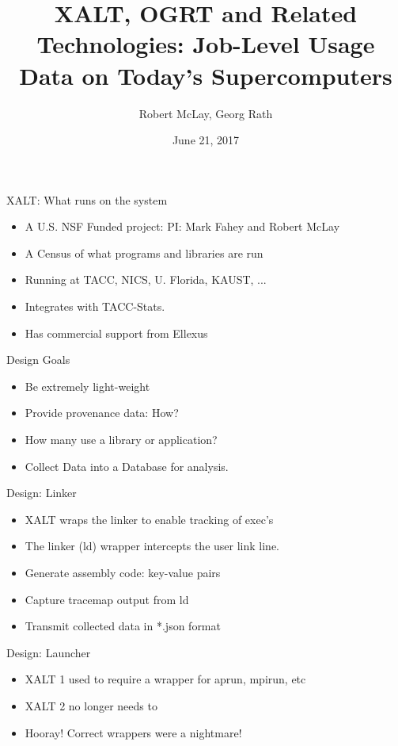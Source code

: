\documentclass{beamer}
\title{ XALT, OGRT and Related Technologies: Job-Level Usage Data on Today's Supercomputers}
\author{Robert McLay, Georg Rath}
\institute{The Texas Advanced Computing Center, RATH.IO}
\date{June 21, 2017}  %
\begin{document}
\begin{frame}
  \titlepage
\end{frame}

\begin{frame}{XALT: What runs on the system}
  \begin{itemize}
    \item A U.S. NSF Funded project: PI: Mark Fahey and Robert McLay
    \item A Census of what programs and libraries are run
    \item Running at TACC, NICS, U. Florida, KAUST, ...
    \item Integrates with TACC-Stats.
    \item Has commercial support from Ellexus 
  \end{itemize}
\end{frame}

\begin{frame}{Design Goals}
  \begin{itemize}
    \item Be extremely light-weight
    \item Provide provenance data: How?
    \item How many use a library or application?
    \item Collect Data into a Database for analysis.
  \end{itemize}
\end{frame}

\begin{frame}{Design: Linker}
  \begin{itemize}
    \item XALT wraps the linker to enable tracking of exec's
    \item The linker (ld) wrapper intercepts the user link line.
    \item Generate assembly code: key-value pairs
    \item Capture tracemap output from ld
    \item Transmit collected data in *.json format
  \end{itemize}
\end{frame}

\begin{frame}{Design: Launcher}
  \begin{itemize}
    \item XALT 1 used to require a wrapper for aprun, mpirun, etc
    \item XALT 2 no longer needs to
    \item Hooray! Correct wrappers were a nightmare!
  \end{itemize}
\end{frame}
\end{document}
